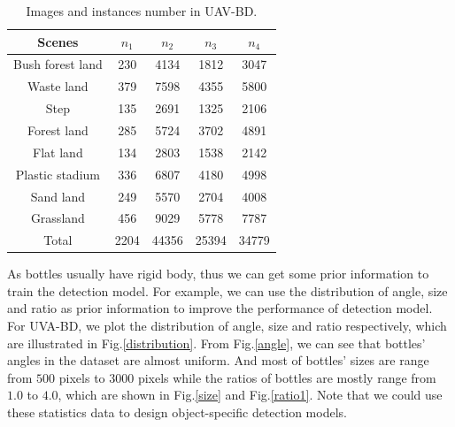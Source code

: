 \begin{table}
	\centering
	\small
	\caption{Images and instances number in UAV-BD.}
	\label{statistics}
	\begin{tabular}{@{}ccc|cc@{}}
		\toprule
		Scenes     & $n_1$& $n_2$ & $n_3$ & $n_4$  \\ \midrule
		Bush forest land       & 230  & 4134  & 1812  & 3047  \\
		Waste land     & 379  & 7598  & 4355  & 5800  \\
		Step       & 135  & 2691  & 1325  & 2106  \\
		Forest land    & 285  & 5724  & 3702  & 4891  \\
		Flat land       & 134  & 2803  & 1538  & 2142  \\
		Plastic stadium & 336  & 6807  & 4180  & 4998  \\
		Sand land       & 249  & 5570  & 2704  & 4008  \\
		Grassland       & 456  & 9029  & 5778  & 7787  \\ \midrule
		Total      & 2204 & 44356 & 25394 & 34779 \\ \bottomrule
	\end{tabular}
\end{table}


As bottles usually have rigid body, thus we can get some prior information to train the detection model. For example, we can use the distribution of angle, size and ratio as prior information to improve the performance of detection model. For UVA-BD, we plot the distribution of angle, size and ratio respectively, which are illustrated in Fig.\ref{distribution}. From Fig.\ref{angle}, we can see that bottles' angles in the dataset are almost uniform. And most of bottles' sizes are range from $500 $ pixels to $ 3000 $ pixels while the ratios of bottles are mostly range from $ 1.0 $ to $ 4.0 $, which are shown in Fig.\ref{size} and Fig.\ref{ratio1}. Note that we could use these statistics data to design object-specific detection models.


